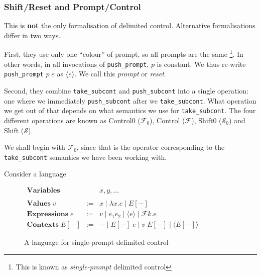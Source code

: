 \subsubsection{Shift/Reset and Prompt/Control}
This is \textbf{not} the only formalisation of delimited control. Alternative formalisations differ in two ways.

First, they use only one ``colour'' of prompt, so all prompts are the same \footnote{This is known as \textit{single-prompt} delimited control}. In other words, in all invocations of \texttt{push\_prompt}, $p$ is constant. We thus re-write \texttt{push\_prompt} $p \; e$ as $\langle e \rangle$. We call this \textit{prompt} or \textit{reset}. 

Second, they combine \texttt{take\_subcont} and \texttt{push\_subcont} into a single operation: one where we immediately \texttt{push\_subcont} after we \texttt{take\_subcont}. What operation we get out of that depends on what semantics we use for \texttt{take\_subcont}. The four different operations are known as Control0 ($\mathcal{F}_0$), Control ($\mathcal{F}$), Shift0 ($\mathcal{S}_0$) and Shift ($\mathcal{S}$).

We shall begin with $\mathcal{F}_0$, since that is the operator corresponding to the \texttt{take\_subcont} semantics we have been working with. 

Consider a language

\begin{figure}[H]
    \centering
    $\begin{array}{lrl}
        \textbf{Variables} & & x, y, \ldots \\
        \\
        \textbf{Values} \; v & := & x \mid \lambda x.e \mid E[-] \\
        \textbf{Expressions} \; e & := &v \mid e_1 e_2 \mid \langle e \rangle \mid \mathcal{F} k. e
        \\
        \textbf{Contexts}\; E[-] & := & - \mid E[-] \; e \mid v \; E[-] \mid \langle E[-] \rangle
    \end{array}$
    \caption{A language for single-prompt delimited control}
    \label{fig:language-shift-reset}
\end{figure}

